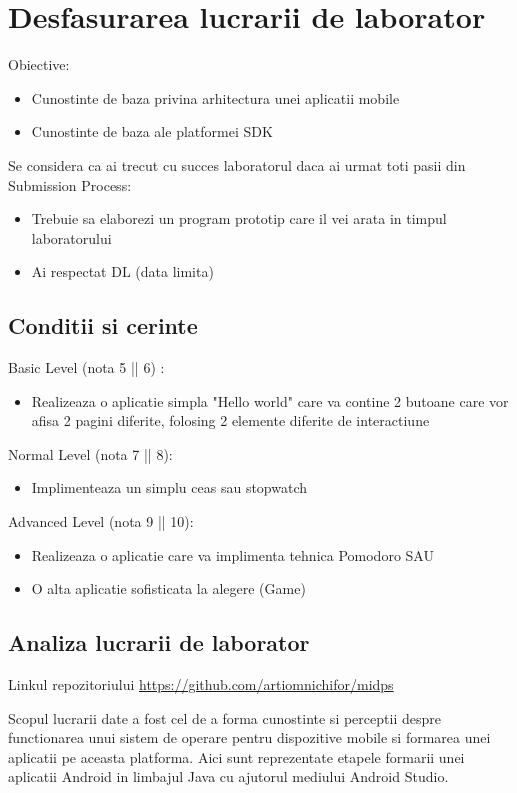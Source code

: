 \section{Desfasurarea lucrarii de laborator}
Obiective:
\begin{itemize}
	\item Cunostinte de baza privina arhitectura unei aplicatii mobile
	\item Cunostinte de baza ale platformei SDK
\end{itemize}

Se considera ca ai trecut cu succes laboratorul daca ai urmat toti pasii din Submission Process:
\begin{itemize}
	\item Trebuie sa elaborezi un program prototip care il vei arata in timpul laboratorului
	\item Ai respectat DL (data limita)
\end{itemize}
\subsection{Conditii si cerinte}

Basic Level (nota 5 || 6) :
\begin{itemize}
	\item Realizeaza o aplicatie simpla "Hello world" care va contine 2 butoane care vor afisa 2 pagini diferite, folosing 2 elemente diferite de interactiune
\end{itemize}

Normal Level (nota 7 || 8):
\begin{itemize}
	\item Implimenteaza un simplu ceas sau stopwatch
\end{itemize}

Advanced Level (nota 9 || 10):
\begin{itemize}
	\item Realizeaza o aplicatie care va implimenta tehnica Pomodoro SAU
	\item O alta aplicatie sofisticata la alegere (Game)
\end{itemize}
\subsection{Analiza lucrarii de laborator}

	Linkul repozitoriului  \url{https://github.com/artiomnichifor/midps}

	Scopul lucrarii date a fost cel de a forma cunostinte si perceptii despre functionarea unui sistem de operare pentru dispozitive mobile si formarea unei aplicatii pe aceasta platforma. Aici sunt reprezentate etapele formarii unei aplicatii Android in limbajul Java cu ajutorul mediului Android Studio.
	 

